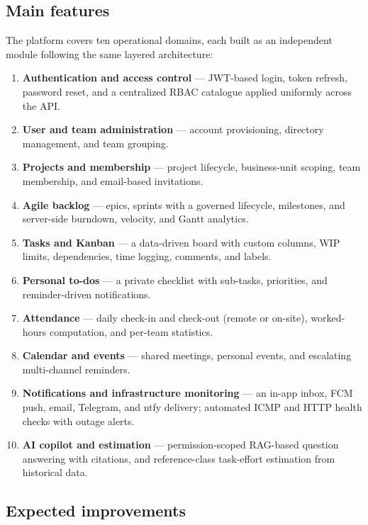
\subsection{Main features}

The platform covers ten operational domains, each built as an independent module following the
same layered architecture:

\begin{enumerate}
  \item \textbf{Authentication and access control} --- JWT-based login, token refresh, password
    reset, and a centralized RBAC catalogue applied uniformly across the API.
  \item \textbf{User and team administration} --- account provisioning, directory management, and
    team grouping.
  \item \textbf{Projects and membership} --- project lifecycle, business-unit scoping, team
    membership, and email-based invitations.
  \item \textbf{Agile backlog} --- epics, sprints with a governed lifecycle, milestones, and
    server-side burndown, velocity, and Gantt analytics.
  \item \textbf{Tasks and Kanban} --- a data-driven board with custom columns, WIP limits,
    dependencies, time logging, comments, and labels.
  \item \textbf{Personal to-dos} --- a private checklist with sub-tasks, priorities, and
    reminder-driven notifications.
  \item \textbf{Attendance} --- daily check-in and check-out (remote or on-site), worked-hours
    computation, and per-team statistics.
  \item \textbf{Calendar and events} --- shared meetings, personal events, and escalating
    multi-channel reminders.
  \item \textbf{Notifications and infrastructure monitoring} --- an in-app inbox, FCM push, email,
    Telegram, and ntfy delivery; automated ICMP and HTTP health checks with outage alerts.
  \item \textbf{AI copilot and estimation} --- permission-scoped RAG-based question answering with
    citations, and reference-class task-effort estimation from historical data.
\end{enumerate}

\subsection{Expected improvements}

